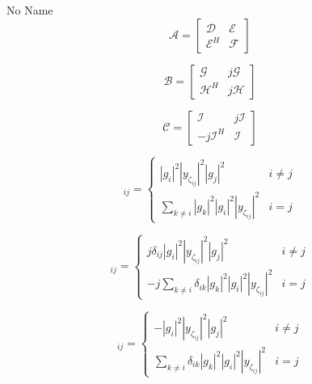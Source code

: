 \documentclass[a4paper,10pt]{article}
\begin{document}
\begin{section}{No Name}
\begin{equation}
\boldsymbol{\mathcal{A}} =
\begin{bmatrix}
\boldsymbol{\mathcal{D}} & \boldsymbol{\mathcal{E}}\\
\boldsymbol{\mathcal{E}}^H & \boldsymbol{\mathcal{F}}
\end{bmatrix}
\end{equation}

\begin{equation}
\boldsymbol{\mathcal{B}} =
\begin{bmatrix}
\boldsymbol{\mathcal{G}} & j\boldsymbol{\mathcal{G}}\\
\boldsymbol{\mathcal{H}}^H & j\boldsymbol{\mathcal{H}}
\end{bmatrix}
\end{equation}

\begin{equation}
\boldsymbol{\mathcal{C}} =
\begin{bmatrix}
\boldsymbol{\mathcal{I}} & j\boldsymbol{\mathcal{I}}\\
-j\boldsymbol{\mathcal{I}}^H & \boldsymbol{\mathcal{I}}
\end{bmatrix}
\end{equation}

\begin{equation}
[\boldsymbol{\mathcal{D}}]_{ij} = 
\begin{cases}
|g_i|^2|y_{\zeta_{ij}}|^2|g_j|^2 & i\neq j\\
\sum_{k \neq i} |g_k|^2|g_i|^2|y_{\zeta_{ij}}|^2 & i = j
\end{cases}
\end{equation}

\begin{equation}
[\boldsymbol{\mathcal{E}}]_{ij} =
\begin{cases}
j \delta_{ij} |g_i|^2|y_{\zeta_{ij}}|^2|g_j|^2 & i\neq j\\
-j \sum_{k \neq i} \delta_{ik} |g_k|^2|g_i|^2|y_{\zeta_{ij}}|^2 & i = j
\end{cases}
\end{equation}

\begin{equation}
[\boldsymbol{\mathcal{F}}]_{ij} =
\begin{cases}
 -|g_i|^2|y_{\zeta_{ij}}|^2|g_j|^2 & i\neq j\\
 \sum_{k \neq i} \delta_{ik} |g_k|^2|g_i|^2|y_{\zeta_{ij}}|^2 & i = j
\end{cases}
\end{equation}


\end{section}
\end{document}
